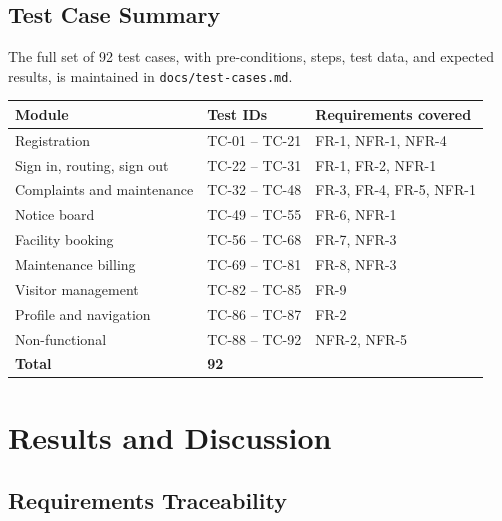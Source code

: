 \documentclass{tietreport}
\renewcommand{\_}{\textunderscore\allowbreak}
\begin{document}
\subsection{Test Case Summary}

The full set of 92 test cases, with pre-conditions, steps, test data, and
expected results, is maintained in \texttt{docs/test-cases.md}.

\begin{longtable}{L{5.2cm} L{3cm} L{5.4cm}}
\toprule
\textbf{Module} & \textbf{Test IDs} & \textbf{Requirements covered} \\
\midrule
\endhead
Registration & TC-01 -- TC-21 & FR-1, NFR-1, NFR-4 \\
Sign in, routing, sign out & TC-22 -- TC-31 & FR-1, FR-2, NFR-1 \\
Complaints and maintenance & TC-32 -- TC-48 & FR-3, FR-4, FR-5, NFR-1 \\
Notice board & TC-49 -- TC-55 & FR-6, NFR-1 \\
Facility booking & TC-56 -- TC-68 & FR-7, NFR-3 \\
Maintenance billing & TC-69 -- TC-81 & FR-8, NFR-3 \\
Visitor management & TC-82 -- TC-85 & FR-9 \\
Profile and navigation & TC-86 -- TC-87 & FR-2 \\
Non-functional & TC-88 -- TC-92 & NFR-2, NFR-5 \\
\midrule
\textbf{Total} & \textbf{92} & \\
\bottomrule
\end{longtable}


\section{Results and Discussion}

\subsection{Requirements Traceability}
\end{document}
